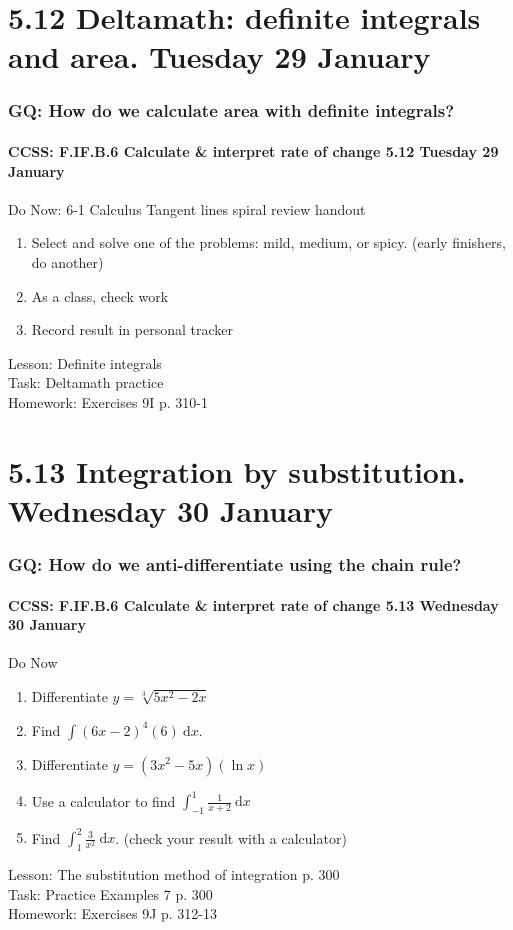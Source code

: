 \documentclass{beamer}
\begin{document}
\section{5.12 Deltamath: definite integrals and area. Tuesday 29 January}
  \frame
  {
    \frametitle{GQ: How do we calculate area with definite integrals?}
    \framesubtitle{CCSS: F.IF.B.6 Calculate \& interpret rate of change \hfill \alert{5.12 Tuesday 29 January}}

    \begin{block}{Do Now: 6-1 Calculus Tangent lines spiral review handout}
    \begin{enumerate}
        \item Select and solve one of the problems: mild, medium, or spicy. (early finishers, do another)
        \item As a class, check work
        \item Record result in personal tracker
    \end{enumerate}
    \end{block}
    Lesson: Definite integrals\\%
    Task: Deltamath practice\\%
    Homework: Exercises 9I p. 310-1
  }

\section{5.13 Integration by substitution. Wednesday 30 January}
  \frame
  {
    \frametitle{GQ: How do we anti-differentiate using the chain rule?}
    \framesubtitle{CCSS: F.IF.B.6 Calculate \& interpret rate of change \hfill \alert{5.13 Wednesday 30 January}}

    \begin{block}{Do Now}
    \begin{enumerate}
        \item Differentiate $y=\sqrt[3]{5x^2-2x}$
        \item Find $\int{(6x-2)^4(6)} \ \mathrm{d}x$.
        \item Differentiate $y={(3x^2-5x)(\ln x)}$
        \item Use a calculator to find $\displaystyle \int_{-1}^{1}{\frac{1}{x+2}}\ \mathrm{d}x$
        \item Find $\displaystyle \int_1^2 \frac{3}{x^2}\ \mathrm{d}x$. (check your result with a calculator)
    \end{enumerate}
    \end{block}
    Lesson: The substitution method of integration p. 300\\%
    Task: Practice Examples 7 p. 300\\%
    Homework: Exercises 9J p. 312-13
  }
\end{document}
